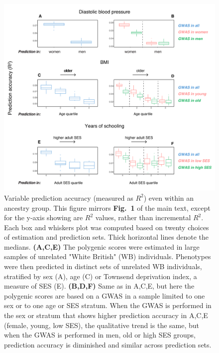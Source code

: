 \documentclass[hidelinks, 12pt]{article}
\begin{document}
\begin{figure}[h]
\centering
\includegraphics[width=\textwidth]{supp_figures/supp_raw_R2_to_env_boxplot_nice.pdf}
\caption[Variable prediction accuracy (measured as $R^2$) even within an ancestry group.]{\small Variable prediction accuracy (measured as $R^2$) even within an ancestry group.  This figure mirrors {\bf Fig.~1} of the main text, except for the y-axis showing are $R^2$ values, rather than incremental $R^2$.  Each box and whiskers plot was computed based on twenty choices of estimation and prediction sets. Thick horizontal lines denote the medians.  {\bf (A,C,E)} The polygenic scores were estimated in large samples of unrelated "White British" (WB) individuals. Phenotypes were then predicted in distinct sets of unrelated WB individuals, stratified by sex (A), age (C) or Townsend deprivation index, a measure of SES (E).  {\bf (B,D,F)} Same as in A,C,E, but here the polygenic scores are based on a GWAS in a sample limited to one sex or to one age or SES stratum.  When the GWAS is performed in the sex or stratum that shows higher prediction accuracy in A,C,E (female, young, low SES), the qualitative trend is the same, but when the GWAS is performed in men, old or high SES groups, prediction accuracy is diminished and similar across prediction sets.}
\label{fig:prediction_accuracy_strata_r2_including_covariates}
\end{figure}

\pagebreak
\end{document}
